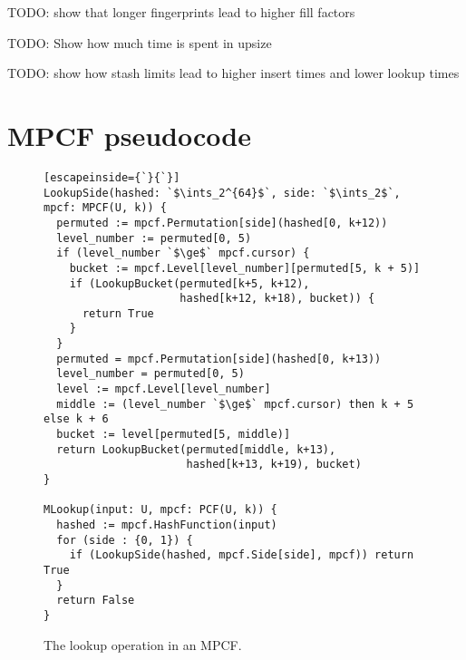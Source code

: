 \documentclass[letterpaper, 11pt]{article}
\newcommand{\ints}{\mathbb{Z}}
\begin{document}


TODO: show that longer fingerprints lead to higher fill factors


TODO: Show how much time is spent in upsize

TODO: show how stash limits lead to higher insert times and lower lookup times





\appendix
\section{MPCF pseudocode}
\label{mpcf-appendix}

\begin{figure}
\begin{lstlisting}[escapeinside={`}{`}]
LookupSide(hashed: `$\ints_2^{64}$`, side: `$\ints_2$`, mpcf: MPCF(U, k)) {
  permuted := mpcf.Permutation[side](hashed[0, k+12))
  level_number := permuted[0, 5)
  if (level_number `$\ge$` mpcf.cursor) {
    bucket := mpcf.Level[level_number][permuted[5, k + 5)]
    if (LookupBucket(permuted[k+5, k+12),
                     hashed[k+12, k+18), bucket)) {
      return True
    }
  }
  permuted = mpcf.Permutation[side](hashed[0, k+13))
  level_number = permuted[0, 5)
  level := mpcf.Level[level_number]
  middle := (level_number `$\ge$` mpcf.cursor) then k + 5 else k + 6
  bucket := level[permuted[5, middle)]
  return LookupBucket(permuted[middle, k+13),
                      hashed[k+13, k+19), bucket)
}

MLookup(input: U, mpcf: PCF(U, k)) {
  hashed := mpcf.HashFunction(input)
  for (side : {0, 1}) {
    if (LookupSide(hashed, mpcf.Side[side], mpcf)) return True
  }
  return False
}
\end{lstlisting}
\caption{The lookup operation in an MPCF.}
\end{figure}
\end{document}
